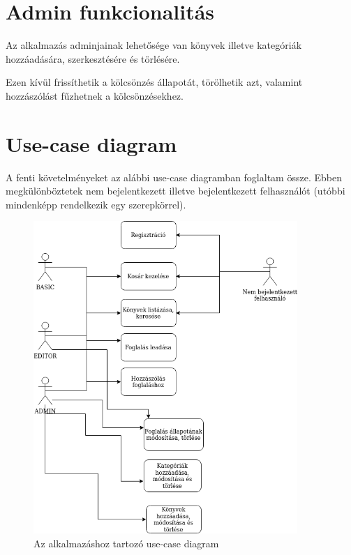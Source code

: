 \section{Admin funkcionalitás}

Az alkalmazás adminjainak lehetősége van könyvek illetve kategóriák hozzáadására, szerkesztésére és törlésére.

Ezen kívül frissíthetik a kölcsönzés állapotát, törölhetik azt, valamint hozzászólást fűzhetnek a kölcsönzésekhez.


\section{Use-case diagram}

A fenti követelményeket az alábbi use-case diagramban foglaltam össze. Ebben megkülönböztetek nem bejelentkezett illetve bejelentkezett felhasználót (utóbbi mindenképp rendelkezik egy szerepkörrel).

\begin{figure}[!ht]
  \centering
  \includegraphics[width=100mm, keepaspectratio]{figures/usecase.png}
  \caption{Az alkalmazáshoz tartozó use-case diagram}
  \label{fig:UseCase}
\end{figure}

